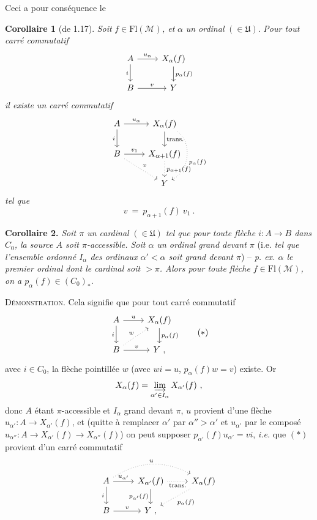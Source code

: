 \documentclass[11pt]{article}
\newcommand{\printedpage}[1]{\marginpar{\footnotesize p.~#1}}
\newcommand{\msp}[1]{\marginpar{\footnotesize [#1]}}
\newcommand{\cM}{\mathcal{M}}
\newcommand{\Fl}{\mathrm{Fl}}
\newcommand{\fU}{\mathfrak{U}}
\begin{document}
Ceci a pour conséquence le

\textbf{Corollaire 1} (de 1.17). \textit{Soit} $f \in \Fl(\cM)$\textit{, et} $\alpha$ \textit{un ordinal} $(\in \fU)$. \textit{Pour tout carré commutatif}
\[
\begin{tikzcd}
A \arrow[r, "u_\alpha"] \arrow[d, "i"'] & X_\alpha(f) \arrow[d, "p_\alpha(f)"] \\
B \arrow[r, "v"] & Y
\end{tikzcd}
\]
\printedpage{6}
\textit{il existe un carré commutatif}
\[
\begin{tikzcd}
A \arrow[r, "u_\alpha"] \arrow[d, "i"'] & X_\alpha(f) \arrow[d, "\text{trans.}"] \arrow[dd, dotted, bend left=60, "p_\alpha(f)"] \\
B \arrow[r, "v_1"] \arrow[dr, dotted, "v"] & X_{\alpha+1}(f) \arrow[d, dotted, "p_{\alpha+1}(f)"] \\
 & Y
\end{tikzcd}
\]
\textit{tel que}
\[
v \ = \ p_{\alpha+1}(f)\ v_1 \ .
\]

\msp{page 7}

\textbf{Corollaire 2.} \textit{Soit $\pi$ un cardinal} $(\in \fU)$ \textit{tel que pour toute flèche $i : A \longrightarrow B$ dans $C_0$, la source $A$ soit $\pi$-accessible. Soit $\alpha$ un ordinal grand devant $\pi$} (i.e. \textit{tel que l'ensemble ordonné $I_\alpha$ des ordinaux $\alpha' < \alpha$ soit grand devant $\pi$}) -- \textit{p. ex. $\alpha$ le premier ordinal dont le cardinal soit $> \pi$. Alors pour toute flèche $f \in \Fl(\cM)$, on a $p_\alpha(f) \in (C_0)_*$.}

\textsc{Démonstration}. Cela signifie que pour tout carré commutatif
\[
\begin{tikzcd}
A \arrow[r, "u"] \arrow[d, "i"'] & X_\alpha(f) \arrow[d, "p_\alpha(f)"] \\
B \arrow[r, "v"] \arrow[ur, dotted, "w"] & Y \ ,
\end{tikzcd}
\tag*{$(*)$}
\]
avec $i \in C_0$, la flèche pointillée $w$ (avec $wi = u$, $p_\alpha(f)w = v$) existe. Or
\[
X_\alpha(f) = \varinjlim_{\alpha' \in I_\alpha} X_{\alpha'}(f) \ ,
\]
donc $A$ étant $\pi$-accessible et $I_\alpha$ grand devant $\pi$, $u$ provient d'une flèche $u_{\alpha'} : A \longrightarrow X_{\alpha'}(f)$, et (quitte à remplacer $\alpha'$ par $\alpha'' > \alpha'$ et $u_{\alpha'}$ par le composé $u_{\alpha''} : A \longrightarrow X_{\alpha'}(f) \longrightarrow X_{\alpha''}(f)$) on peut supposer $p_{\alpha'}(f)u_{\alpha'} = vi$, \textit{i.e.} que $(*)$ provient d'un carré commutatif
\[
\begin{tikzcd}
A \arrow[r, "u_{\alpha'}"] \arrow[d, "i"'] \arrow[rr, dotted, bend left=30, "u"] & X_{\alpha'}(f) \arrow[r, dotted, "\text{trans.}"'] \arrow[d, "p_{\alpha'}(f)"'] & X_\alpha(f) \arrow[dl, dotted, "p_\alpha(f)"] \\
B \arrow[r, "v"] & Y \ , &
\end{tikzcd}
\]
\end{document}
